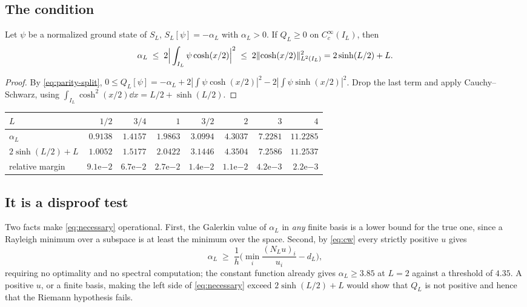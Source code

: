 \subsection{The condition}
\begin{proposition}\label{prop:necessary}
Let $\psi$ be a normalized ground state of $S_L$, $S_L[\psi]=-\alpha_L$ with
$\alpha_L>0$. If $Q_L\geq0$ on $C_c^\infty(I_L)$, then
\begin{equation}\label{eq:necessary}
 \alpha_L\;\leq\;2\Big|\int_{I_L}\psi\cosh(x/2)\Big|^2\;\leq\;
 2\lVert \cosh(x/2)\rVert^2_{L^2(I_L)}=2\sinh(L/2)+L .
\end{equation}
\end{proposition}
\begin{proof}
By \eqref{eq:parity-split},
$0\leq Q_L[\psi]=-\alpha_L+2|\int\psi\cosh(x/2)|^2-2|\int\psi\sinh(x/2)|^2$.
Drop the last term and apply Cauchy--Schwarz, using
$\int_{I_L}\cosh^2(x/2)\dd x=L/2+\sinh(L/2)$.
\end{proof}

\begin{center}
\small
\begin{tabular}{lrrrrrrr}
\toprule
$L$ & $1/2$ & $3/4$ & $1$ & $3/2$ & $2$ & $3$ & $4$\\
\midrule
$\alpha_L$ & $0.9138$ & $1.4157$ & $1.9863$ & $3.0994$ & $4.3037$ & $7.2281$ & $11.2285$\\
$2\sinh(L/2)+L$ & $1.0052$ & $1.5177$ & $2.0422$ & $3.1446$ & $4.3504$ & $7.2586$ & $11.2537$\\
relative margin & $9.1$e$-2$ & $6.7$e$-2$ & $2.7$e$-2$ & $1.4$e$-2$ & $1.1$e$-2$ & $4.2$e$-3$ & $2.2$e$-3$\\
\bottomrule
\end{tabular}
\end{center}

\subsection{It is a disproof test}
Two facts make \eqref{eq:necessary} operational. First, the Galerkin value of
$\alpha_L$ in \emph{any} finite basis is a lower bound for the true one, since a
Rayleigh minimum over a subspace is at least the minimum over the space.
Second, by \eqref{eq:cw} every strictly positive $u$ gives
\begin{equation}\label{eq:cw-lower}
 \alpha_L\;\geq\;\frac1h\Big(\min_i\frac{(N_Lu)_i}{u_i}-d_L\Big),
\end{equation}
requiring no optimality and no spectral computation; the constant function
already gives $\alpha_L\geq3.85$ at $L=2$ against a threshold of $4.35$. A
positive $u$, or a finite basis, making the left side of \eqref{eq:necessary}
exceed $2\sinh(L/2)+L$ would show that $Q_L$ is not positive and hence that the
Riemann hypothesis fails.

